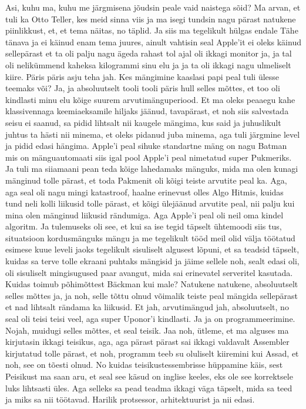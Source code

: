 Asi, kuhu ma, kuhu me järgmisena jõudsin peale vaid naistega sõid? Ma arvan, et tuli ka Otto Teller, kes meid sinna viis ja ma isegi tundsin nagu pärast natukene piinlikkust, et, et tema näitas, no täplid. Ja siis ma tegelikult hülgas endale Tähe tänava ja ei käinud enam tema juures, ainult vahtisin seal Apple'it ei oleks käinud sellepärast et ta oli palju nagu ägeda rahast tol ajal oli ikkagi monitor ja, ja tal oli nelikümmend kaheksa kilogrammi sinu elu ja ja ta oli ikkagi nagu ulmeliselt kiire.
Päris päris asju teha jah. Kes mängimine kaaslasi papi peal tuli ülesse teemaks või?
Ja, ja absoluutselt tooli tooli päris hull selles mõttes, et too oli kindlasti minu elu kõige suurem arvutimänguperiood. Et ma oleks peaaegu kahe klassivennaga keemiaeksamile hiljaks jäänud, tavapärast, et noh siis salvestada seisu ei saanud, sa pidid lihtsalt nii kaugele mängima, kus said ja juhuslikult juhtus ta hästi nii minema, et oleks pidanud juba minema, aga tuli järgmine level ja pidid edasi hängima.
Apple'i peal sihuke standartne mäng on nagu Batman mis on mänguautomaati siis igal pool Apple'i peal nimetatud super Pukmeriks. Ja tuli ma siiamaani pean teda kõige lahedamaks mänguks, mida ma olen kunagi mänginud tolle pärast, et toda Pakmenit oli kõigi teiste arvutite peal ka. Aga, aga seal oli nagu mingi katastroof, haalne erinevust olles Algo Hitmis, kuidas tund neli kolli liikusid tolle pärast, et kõigi ülejäänud arvutite peal, nii palju kui mina olen mänginud liikusid rändumiga. Aga Apple'i peal oli neil oma kindel algoritm. Ja tulemuseks oli see, et kui sa ise tegid täpselt ühtemoodi siis tus, situatsioon kordusmänguks mängu ja me tegelikult tööd meil olid välja töötatud esimese kuue leveli jaoks tegelikult sisuliselt algusest lõpuni, et sa teadsid täpselt, kuidas sa terve tolle ekraani puhtaks mängisid ja jäime sellele noh, sealt edasi oli, oli sisuliselt mingisugused paar avangut, mida sai erinevatel serveritel kasutada.
Kuidas toimub põhimõttest Bäckman kui male?
Natukene natukene, absoluutselt selles mõttes ja, ja noh, selle tõttu olnud võimalik teiste peal mängida sellepärast et nad lihtsalt rändama ka liikusid. Et jah, arvutimängud jah, absoluutselt, no seal oli teisi teisi veel, aga super Uponor'i kindlasti.
Ja ja on programmeerimine.
Nojah, muidugi selles mõttes, et seal teisik. Jaa noh, ütleme, et ma alguses ma kirjutasin ikkagi teisikus, aga, aga pärast pärast sai ikkagi valdavalt Assembler kirjutatud tolle pärast, et noh, programm teeb su oluliselt kiiremini kui Assad, et noh, see on tõesti olnud.
No kuidas teisikustessembrisse hüppamine käis, sest Peisikust ma saan aru, et seal see käsud on inglise keeles, eks ole see korrektsele luks lihtsasti üles. Aga selleks sa pead teadma ikkagi väga täpselt, mida sa teed ja miks sa nii töötavad. Harilik protsessor, arhitektuurist ja nii edasi.
